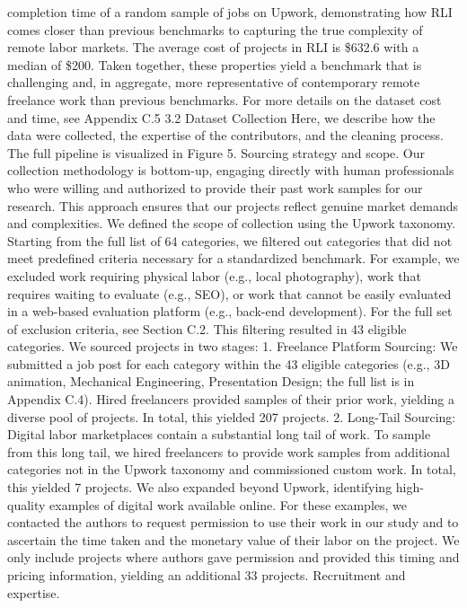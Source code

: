 completion time of a random sample of jobs on Upwork, demonstrating how RLI comes closer than
previous benchmarks to capturing the true complexity of remote labor markets. The average cost of
projects in RLI is \$632.6 with a median of \$200. Taken together, these properties yield a benchmark
that is challenging and, in aggregate, more representative of contemporary remote freelance work
than previous benchmarks. For more details on the dataset cost and time, see Appendix C.5
3.2
Dataset Collection
Here, we describe how the data were collected, the expertise of the contributors, and the cleaning
process. The full pipeline is visualized in Figure 5.
Sourcing strategy and scope.
Our collection methodology is bottom-up, engaging directly with
human professionals who were willing and authorized to provide their past work samples for our
research. This approach ensures that our projects reflect genuine market demands and complexities.
We defined the scope of collection using the Upwork taxonomy. Starting from the full list of 64
categories, we filtered out categories that did not meet predefined criteria necessary for a standardized
benchmark. For example, we excluded work requiring physical labor (e.g., local photography),
work that requires waiting to evaluate (e.g., SEO), or work that cannot be easily evaluated in a
web-based evaluation platform (e.g., back-end development). For the full set of exclusion criteria, see
Section C.2. This filtering resulted in 43 eligible categories.
We sourced projects in two stages:
1. Freelance Platform Sourcing: We submitted a job post for each category within the 43
eligible categories (e.g., 3D animation, Mechanical Engineering, Presentation Design; the
full list is in Appendix C.4). Hired freelancers provided samples of their prior work, yielding
a diverse pool of projects. In total, this yielded 207 projects.
2. Long-Tail Sourcing: Digital labor marketplaces contain a substantial long tail of work. To
sample from this long tail, we hired freelancers to provide work samples from additional
categories not in the Upwork taxonomy and commissioned custom work. In total, this
yielded 7 projects. We also expanded beyond Upwork, identifying high-quality examples
of digital work available online. For these examples, we contacted the authors to request
permission to use their work in our study and to ascertain the time taken and the monetary
value of their labor on the project. We only include projects where authors gave permission
and provided this timing and pricing information, yielding an additional 33 projects.
Recruitment and expertise.
